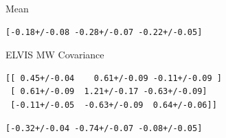 \documentclass[a4paper,fleqn,usenatbib]{mnras}
\begin{document}
Mean
\begin{verbatim}
[-0.18+/-0.08 -0.28+/-0.07 -0.22+/-0.05]
\end{verbatim}

ELVIS MW
Covariance
\begin{verbatim}
[[ 0.45+/-0.04    0.61+/-0.09 -0.11+/-0.09 ]
 [ 0.61+/-0.09  1.21+/-0.17 -0.63+/-0.09]
 [-0.11+/-0.05  -0.63+/-0.09  0.64+/-0.06]]
\end{verbatim}

\begin{verbatim}
[-0.32+/-0.04 -0.74+/-0.07 -0.08+/-0.05]
\end{verbatim}
\end{document}
